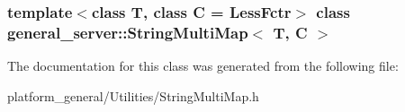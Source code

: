 \subsubsection*{template$<$class \-T, class \-C = \-Less\-Fctr$>$ class general\-\_\-server\-::\-String\-Multi\-Map$<$ T, C $>$}



\-The documentation for this class was generated from the following file\-:\begin{DoxyCompactItemize}
\item 
platform\-\_\-general/\-Utilities/\-String\-Multi\-Map.\-h\end{DoxyCompactItemize}
